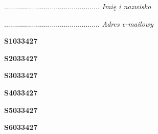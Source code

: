 \begin{turn}{90}\begin{minipage}{\linewidth} \vspace{20mm} ................................................  \textit{Imię i nazwisko}\end{minipage}\end{turn}

\begin{turn}{90}\begin{minipage}{\linewidth} \vspace{20mm} ................................................  \textit{Adres e-mailowy}\end{minipage}\end{turn}

\begin{turn}{90}\huge \begin{minipage}{\linewidth} \vspace{10mm}\textbf{S1033427}\end{minipage}\end{turn}

\begin{turn}{90}\huge \begin{minipage}{\linewidth} \vspace{10mm}\textbf{S2033427}\end{minipage}\end{turn}

\begin{turn}{90}\huge \begin{minipage}{\linewidth} \vspace{10mm}\textbf{S3033427}\end{minipage}\end{turn}

\begin{turn}{90}\huge \begin{minipage}{\linewidth} \vspace{10mm}\textbf{S4033427}\end{minipage}\end{turn}

\begin{turn}{90}\huge \begin{minipage}{\linewidth} \vspace{10mm}\textbf{S5033427}\end{minipage}\end{turn}

\begin{turn}{90}\huge \begin{minipage}{\linewidth} \vspace{10mm}\textbf{S6033427}\end{minipage}\end{turn}

